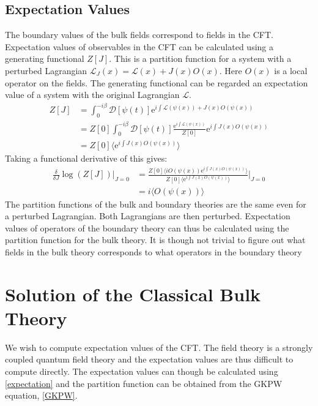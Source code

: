 \documentclass[12pt]{report}
\newcommand{\e}{\ensuremath{\mathrm{e}}}
\renewcommand{\L}{\ensuremath{\mathcal{L}}}
\renewcommand{\i}{\ensuremath{i}}
\begin{document}
\section{Expectation Values}
The boundary values of the bulk fields correspond to fields in the CFT. Expectation values of observables in the CFT can be calculated using a generating functional $Z[J]$. This is a partition function for a system with a perturbed Lagrangian $\L_J(x)=\L(x)+J(x)O(x)$. Here $O(x)$ is a local operator on the fields. The generating functional can be regarded an expectation value of a system with the original Lagrangian $\L$.
\begin{equation}
\begin{split}
 Z[J]&=\int_0^{-\i\beta} \mathcal{D}[\psi(t)]\e^{\i \int \L(\psi(x))+J(x)O(\psi(x))}\\
&=Z[0]\int_0^{-\i\beta} \mathcal{D}[\psi(t)]\frac{\e^{\i\int \L(\psi(x))}}{Z[0]}\e^{\i\int J(x)O(\psi(x))}\\
&=Z[0]\langle\e^{\i\int J(x)O(\psi(x))}\rangle
\end{split}
\end{equation}
Taking a functional derivative of this gives:
\begin{equation}
\begin{split}
 \frac{\delta}{\delta J}\log(Z[J])|_{J=0}&=\frac{Z[0]\langle\i O(\psi(x))\e^{\i\int J(x)O(\psi(x))}\rangle}{  Z[0]\langle\e^{\i \int J(x)O(\psi(x))}\rangle }\big |_{J=0}\\
&=\i \langle O(\psi(x))\rangle\label{expectation}
\end{split}
\end{equation}
The partition functions of the bulk and boundary theories are the same even for a perturbed Lagrangian. Both Lagrangians are then perturbed. Expectation values of operators of the boundary theory can thus be calculated using the partition function for the bulk theory. It is though not trivial to figure out what fields in the bulk theory corresponds to what operators in the boundary theory
\chapter{Solution of the Classical Bulk Theory}
We wish to compute expectation values of the CFT. The field theory is a strongly coupled quantum field theory and the expectation values are thus difficult to compute directly. The expectation values can though be calculated using \eqref{expectation} and the partition function can be obtained from the GKPW equation, \eqref{GKPW}.\\
\end{document}
